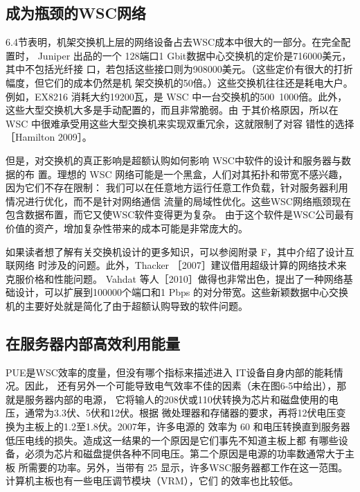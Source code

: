 \subsection{成为瓶颈的WSC网络}

6.4节表明，机架交换机上层的网络设备占去WSC成本中很大的一部分。在完全配置时，
Juniper 出品的一个 128端口1 Gbit数据中心交换机的定价是716000美元，其中不包括光纤接
口，若包括这些接口则为908000美元。（这些定价有很大的打折幅度，但它们的成本仍然是机
架交换机的50倍。）这些交换机往往还是耗电大户。例如，EX8216 消耗大约19200瓦，是 WSC
中一台交换机的500~1000倍。此外，这些大型交换机大多是手动配置的，而且非常脆弱。由
于其价格原因，所以在 WSC 中很难承受用这些大型交换机来实现双重冗余，这就限制了对容
错性的选择［Hamilton 2009］。

但是，对交换机的真正影响是超额认购如何影响 WSC中软件的设计和服务器与数据的布
置。理想的 WSC 网络可能是一个黑盒，人们对其拓扑和带宽不感兴趣，因为它们不存在限制：
我们可以在任意地方运行任意工作负载，针对服务器利用情况进行优化，而不是针对网络通信
流量的局域性优化。这些WSC网络瓶颈现在包含数据布置，而它又使WSC软件变得更为复杂。
由于这个软件是WSC公司最有价值的资产，增加复杂性带来的成本可能是非常庞大的。

如果读者想了解有关交换机设计的更多知识，可以参阅附录 F，其中介绍了设计互联网络
时涉及的问题。此外，Thacker ［2007］建议借用超级计算的网络技术来克服价格和性能问题。
Vahdat 等人［2010］做得也非常出色，提出了一种网络基础设计，可以扩展到100000个端口和1 Pbps
的对分带宽。这些新颖数据中心交换机的主要好处就是简化了由于超额认购导致的软件问题。

\subsection{在服务器内部高效利用能量}
PUE是WSC效率的度量，但没有哪个指标来描述进入 IT设备自身内部的能耗情况。因此，
还有另外一个可能导致电气效率不佳的因素（未在图6-5中给出），那就是服务器内部的电源，
它将输人的208伏或110伏转换为芯片和磁盘使用的电压，通常为3.3伏、5伏和12伏。根据
微处理器和存储器的要求，再将12伏电压变换为主板上的1.2至1.8伏。2007年，许多电源的
效率为 60%
和电压转换直到服务器低压电线的损失。造成这一结果的一个原因是它们事先不知道主板上都
有哪些设备，必须为芯片和磁盘提供各种不同电压。第二个原因是电源的功率数通常大于主板
所需要的功率。另外，当带有 25%
显示，许多WSC服务器都工作在这一范围。计算机主板也有一些电压调节模块（VRM），它们
的效率也比较低。

